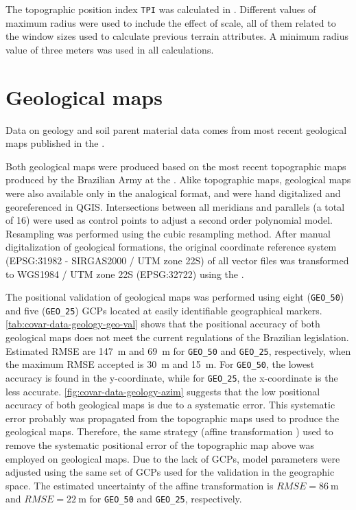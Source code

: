 The topographic position index \texttt{TPI} was calculated in . Different 
values of maximum radius were used to include the effect of scale, all of them related to the window 
sizes used to calculate previous terrain attributes. A minimum radius value of three meters was used 
in all calculations.

\tocless\section{Geological maps}
\label{sec:covar-data-geo-maps}

Data on geology and soil parent material data comes from most recent geological maps published in 
the  \cite{MacielFilho1990, GasparettoEtAl1988}.

Both geological maps were produced based on the most recent topographic maps produced by the 
Brazilian Army at the . Alike topographic maps, geological maps were also 
available only in the analogical format, and were hand digitalized and georeferenced in QGIS. 
Intersections between all meridians and parallels (a total of 16) were used as control points to 
adjust a second order polynomial model. Resampling was performed using the cubic resampling method. 
After manual digitalization of geological formations, the original coordinate reference system 
(EPSG:31982 - SIRGAS2000 / UTM zone 22S) of all vector files was transformed to WGS1984 / UTM zone 
22S (EPSG:32722) using the  \cite{BivandEtAl2013a}.

The positional validation of geological maps was performed using eight (\texttt{GEO\_50}) and five 
(\texttt{GEO\_25}) GCPs located at easily identifiable geographical markers. 
\autoref{tab:covar-data-geology-geo-val} shows that the positional accuracy of both geological maps 
does not meet the current regulations of the Brazilian legislation. Estimated RMSE are \SI{147}{\m} 
and \SI{69}{\m} for \texttt{GEO\_50} and \texttt{GEO\_25}, respectively, when the maximum RMSE 
accepted is \SI{30}{\m} and \SI{15}{\m}. For \texttt{GEO\_50}, the lowest accuracy is found in the 
y-coordinate, while for \texttt{GEO\_25}, the x-coordinate is the less accurate. 
\autoref{fig:covar-data-geology-azim} suggests that the low positional accuracy  of both geological 
maps is due to a systematic error. This systematic error probably was propagated from the 
topographic maps used to produce the geological maps. Therefore, the same strategy (affine 
transformation ) used to remove the systematic positional error of the topographic map above was 
employed on geological maps. Due to the lack of GCPs, model parameters were adjusted using the same 
set of GCPs used for the validation in the geographic space. The estimated uncertainty of the 
affine transformation is $RMSE = \SI{86}{\m}$ and $RMSE = \SI{22}{\m}$ for 
\texttt{GEO\_50} and \texttt{GEO\_25}, respectively.

